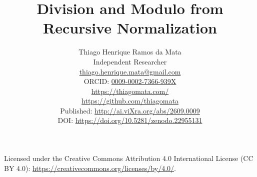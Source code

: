 \documentclass[11pt]{article}
\title{Division and Modulo from Recursive Normalization}
\author{%
  Thiago Henrique Ramos da Mata\\
  \small Independent Researcher\\
  \small \href{mailto:thiago.henrique.mata@gmail.com}{thiago.henrique.mata@gmail.com}\\
  \small ORCID: \href{https://orcid.org/0009-0002-7366-939X}{0009-0002-7366-939X}\\
  \small \url{https://thiagomata.com/}\\
  \small \url{https://github.com/thiagomata}\\
  \small Published: \url{http://ai.viXra.org/abs/2609.0009}\\
  \small DOI: \url{https://doi.org/10.5281/zenodo.22955131}
}
\date{}
\begin{document}
\maketitle



\begin{center}
  \small Licensed under the Creative Commons Attribution 4.0 International
  License (CC BY 4.0): \url{https://creativecommons.org/licenses/by/4.0/}.
\end{center}














\appendix

\end{document}
